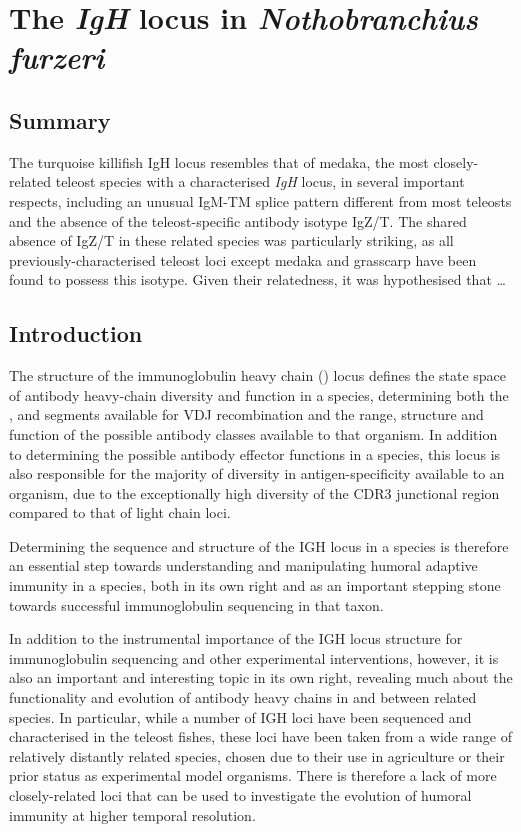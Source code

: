 
\chapter{The \textit{IgH} locus in \textit{Nothobranchius furzeri}}  
\onehalfspacing

\section*{Summary}


The turquoise killifish IgH locus resembles that of medaka, the most closely-related teleost species with a characterised \textit{IgH} locus, in several important respects, including an unusual IgM-TM splice pattern different from most teleosts and the absence of the teleost-specific antibody isotype IgZ/T. The shared absence of IgZ/T in these related species was particularly striking, as all previously-characterised teleost loci except medaka and grasscarp have been found to possess this isotype. Given their relatedness, it was hypothesised that \dots
\pagebreak


\section{Introduction}

The structure of the immunoglobulin heavy chain (\igh{}) locus defines the state space of antibody heavy-chain diversity and function in a species, determining both the \vh, \dh and \jh segments available for VDJ recombination and the range, structure and function of the possible antibody classes available to that organism. In addition to determining the possible antibody effector functions in a species, this locus is also responsible for the majority of diversity in antigen-specificity available to an organism, due to the exceptionally high diversity of the CDR3 junctional region compared to that of light chain loci. 

Determining the sequence and structure of the IGH locus in a species is therefore an essential step towards understanding and manipulating humoral adaptive immunity in a species, both in its own right and as an important stepping stone towards successful immunoglobulin sequencing in that taxon.

In addition to the instrumental importance of the IGH locus structure for immunoglobulin sequencing and other experimental interventions, however, it is also an important and interesting topic in its own right, revealing much about the functionality and evolution of antibody heavy chains in and between related species. In particular, while a number of IGH loci have been sequenced and characterised in the teleost fishes, these loci have been taken from a wide range of relatively distantly related species, chosen due to their use in agriculture or their prior status as experimental model organisms. There is therefore a lack of more closely-related loci that can be used to investigate the evolution of humoral immunity at higher temporal resolution. 

